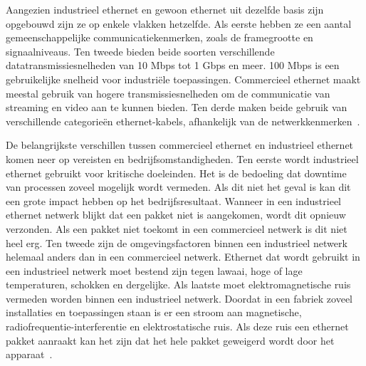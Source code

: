 Aangezien industrieel ethernet en gewoon ethernet uit dezelfde basis zijn opgebouwd zijn ze op enkele vlakken hetzelfde. Als eerste hebben ze een aantal gemeenschappelijke communicatiekenmerken, zoals de framegrootte en signaalniveaus. Ten tweede bieden beide soorten verschillende datatransmissiesnelheden van 10 Mbps tot 1 Gbps en meer. 100 Mbps is een gebruikelijke snelheid voor industriële toepassingen. Commercieel ethernet maakt meestal gebruik van hogere transmissiesnelheden om de communicatie van streaming en video aan te kunnen bieden. Ten derde maken beide gebruik van verschillende categorieën ethernet-kabels, afhankelijk van de netwerkkenmerken~\autocite{Tannehill2020}.

De belangrijkste verschillen tussen commercieel ethernet en industrieel ethernet komen neer op vereisten en bedrijfsomstandigheden. Ten eerste wordt industrieel ethernet gebruikt voor kritische doeleinden. Het is de bedoeling dat downtime van processen zoveel mogelijk wordt vermeden. Als dit niet het geval is kan dit een grote impact hebben op het bedrijfsresultaat. Wanneer in een industrieel ethernet netwerk blijkt dat een pakket niet is aangekomen, wordt dit opnieuw verzonden. Als een pakket niet toekomt in een commercieel netwerk is dit niet heel erg. Ten tweede zijn de omgevingsfactoren binnen een industrieel netwerk helemaal anders dan in een commercieel netwerk. Ethernet dat wordt gebruikt in een industrieel netwerk moet bestend zijn tegen lawaai, hoge of lage temperaturen, schokken en dergelijke. Als laatste moet elektromagnetische ruis vermeden worden binnen een industrieel netwerk. Doordat in een fabriek zoveel installaties en toepassingen staan is er een stroom aan magnetische, radiofrequentie-interferentie en elektrostatische ruis. Als deze ruis een ethernet pakket aanraakt kan het zijn dat het hele pakket geweigerd wordt door het apparaat~\autocite{Tannehill2020}.


